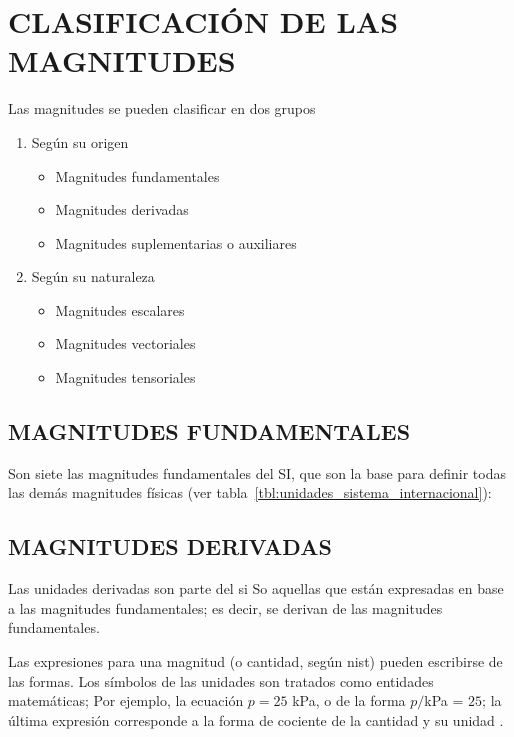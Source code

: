 \section{CLASIFICACIÓN DE LAS MAGNITUDES}
  Las magnitudes se pueden clasificar en dos grupos
    \begin{enumerate}
      \item Según su origen 
        \begin{itemize}
          \item Magnitudes fundamentales
          \item Magnitudes derivadas
          \item Magnitudes suplementarias o auxiliares
        \end{itemize}
      \item Según su naturaleza 
        \begin{itemize}
          \item Magnitudes escalares
          \item Magnitudes vectoriales
          \item Magnitudes tensoriales
        \end{itemize}
    \end{enumerate}
    
  \subsection{MAGNITUDES FUNDAMENTALES}
  Son siete las magnitudes fundamentales del SI, que son la base para definir todas las demás magnitudes físicas (ver tabla~\ref{tbl:unidades_sistema_internacional}):


  \subsection{MAGNITUDES DERIVADAS}
  Las unidades derivadas son parte del \gls{si} So aquellas que están expresadas en base a las magnitudes fundamentales; es decir, se derivan de las magnitudes fundamentales.
  

  Las expresiones para una magnitud (o cantidad, según \gls{nist}) pueden escribirse de las formas. Los símbolos de las unidades son tratados como entidades matemáticas; Por ejemplo, la ecuación $p = 25$ kPa, o de la forma $p/$kPa = $25$; la última expresión corresponde a la forma de cociente de la cantidad y su unidad \parencite[p. 30]{bib:siu_newell2019the}. %

